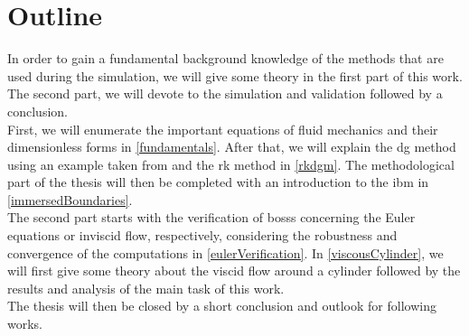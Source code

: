 \section{Outline}
In order to gain a fundamental background knowledge of the methods that are used during the simulation, we will give some theory in the first part of this work. The second part, we will devote to the simulation and validation followed by a conclusion. \\ \indent
First, we will enumerate the important equations of fluid mechanics and their dimensionless forms in \cref{fundamentals}. After that, we will explain the \gls{dg} method using an example taken from \textcite{mueller2014} and the \gls{rk} method in  \cref{rkdgm}. The methodological part of the thesis will then be completed with an introduction to the \gls{ibm} in \cref{immersedBoundaries}. \\ \indent
The second part starts with the verification of \gls{bosss} concerning the Euler equations or inviscid flow, respectively, considering the robustness and convergence of the computations in \cref{eulerVerification}. In  \cref{viscousCylinder}, we will first give some theory about the viscid flow around a cylinder followed by the results and analysis of the main task of this work. \\ \indent
The thesis will then be closed by a short conclusion and outlook for following works.







































